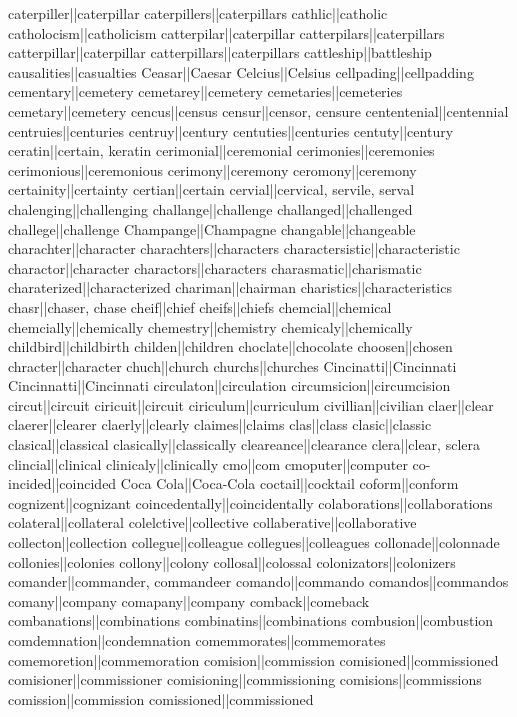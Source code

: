 caterpiller||caterpillar
caterpillers||caterpillars
cathlic||catholic
catholocism||catholicism
catterpilar||caterpillar
catterpilars||caterpillars
catterpillar||caterpillar
catterpillars||caterpillars
cattleship||battleship
causalities||casualties
Ceasar||Caesar
Celcius||Celsius
cellpading||cellpadding
cementary||cemetery
cemetarey||cemetery
cemetaries||cemeteries
cemetary||cemetery
cencus||census
censur||censor, censure
cententenial||centennial
centruies||centuries
centruy||century
centuties||centuries
centuty||century
ceratin||certain, keratin
cerimonial||ceremonial
cerimonies||ceremonies
cerimonious||ceremonious
cerimony||ceremony
ceromony||ceremony
certainity||certainty
certian||certain
cervial||cervical, servile, serval
chalenging||challenging
challange||challenge
challanged||challenged
challege||challenge
Champange||Champagne
changable||changeable
charachter||character
charachters||characters
charactersistic||characteristic
charactor||character
charactors||characters
charasmatic||charismatic
charaterized||characterized
chariman||chairman
charistics||characteristics
chasr||chaser, chase
cheif||chief
cheifs||chiefs
chemcial||chemical
chemcially||chemically
chemestry||chemistry
chemicaly||chemically
childbird||childbirth
childen||children
choclate||chocolate
choosen||chosen
chracter||character
chuch||church
churchs||churches
Cincinatti||Cincinnati
Cincinnatti||Cincinnati
circulaton||circulation
circumsicion||circumcision
circut||circuit
ciricuit||circuit
ciriculum||curriculum
civillian||civilian
claer||clear
claerer||clearer
claerly||clearly
claimes||claims
clas||class
clasic||classic
clasical||classical
clasically||classically
cleareance||clearance
clera||clear, sclera
clincial||clinical
clinicaly||clinically
cmo||com
cmoputer||computer
co-incided||coincided
Coca Cola||Coca-Cola
coctail||cocktail
coform||conform
cognizent||cognizant
coincedentally||coincidentally
colaborations||collaborations
colateral||collateral
colelctive||collective
collaberative||collaborative
collecton||collection
collegue||colleague
collegues||colleagues
collonade||colonnade
collonies||colonies
collony||colony
collosal||colossal
colonizators||colonizers
comander||commander, commandeer
comando||commando
comandos||commandos
comany||company
comapany||company
comback||comeback
combanations||combinations
combinatins||combinations
combusion||combustion
comdemnation||condemnation
comemmorates||commemorates
comemoretion||commemoration
comision||commission
comisioned||commissioned
comisioner||commissioner
comisioning||commissioning
comisions||commissions
comission||commission
comissioned||commissioned
